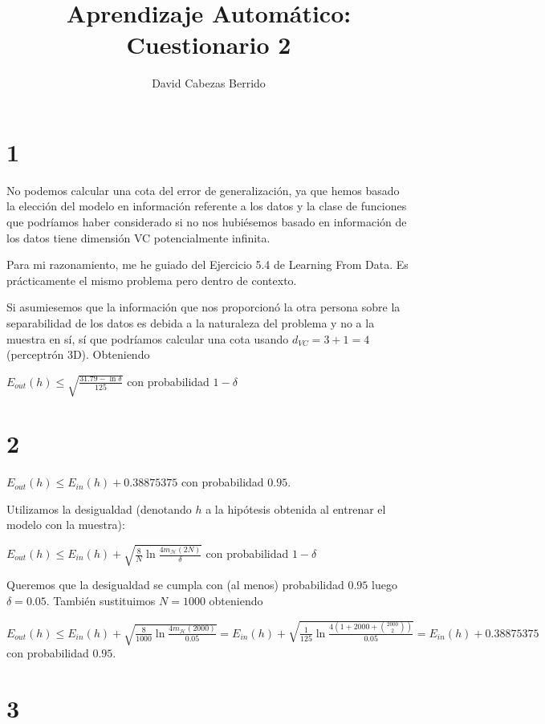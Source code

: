\documentclass{article}
\begin{document}
\title{Aprendizaje Automático: Cuestionario 2}
\author{David Cabezas Berrido}
\maketitle

\section{1}

No podemos calcular una cota del error de generalización, ya que hemos
basado la elección del modelo en información referente a los datos y
la clase de funciones que podríamos haber considerado si no nos
hubiésemos basado en información de los datos tiene dimensión VC
potencialmente infinita.

Para mi razonamiento, me he guiado del Ejercicio 5.4 de Learning From
Data. Es prácticamente el mismo problema pero dentro de contexto.

Si asumiesemos que la información que nos proporcionó la otra persona
sobre la separabilidad de los datos es debida a la naturaleza del
problema y no a la muestra en sí, sí que podríamos calcular una cota
usando \(d_{VC}=3+1=4\) (perceptrón 3D). Obteniendo

\(E_{out}(h)\leq\sqrt{\frac{31.79-\ln\delta}{125}}\) con probabilidad \(1-\delta\)

\section{2}

\(E_{out}(h)\leq E_{in}(h)+0.38875375\) con probabilidad \(0.95\).


Utilizamos la desigualdad (denotando \(h\) a la hipótesis obtenida al
entrenar el modelo con la muestra):

\(E_{out}(h)\leq E_{in}(h)+\sqrt{\frac{8}{N}\ln\frac{4 m_{\mathcal{H}}(2N)}{\delta}}\) con probabilidad \(1-\delta\)

Queremos que la desigualdad se cumpla con (al menos) probabilidad
\(0.95\) luego \(\delta=0.05\). También sustituimos \(N=1000\) obteniendo

\(E_{out}(h)\leq E_{in}(h)+\sqrt{\frac{8}{1000}\ln\frac{4m_{\mathcal{H}}(2000)}{0.05}} = E_{in}(h)+\sqrt{\frac{1}{125}\ln\frac{4(1+2000+\binom{2000}{2})}{0.05}}=E_{in}(h)+0.38875375\)
con probabilidad \(0.95\).

\section{3}
\end{document}
